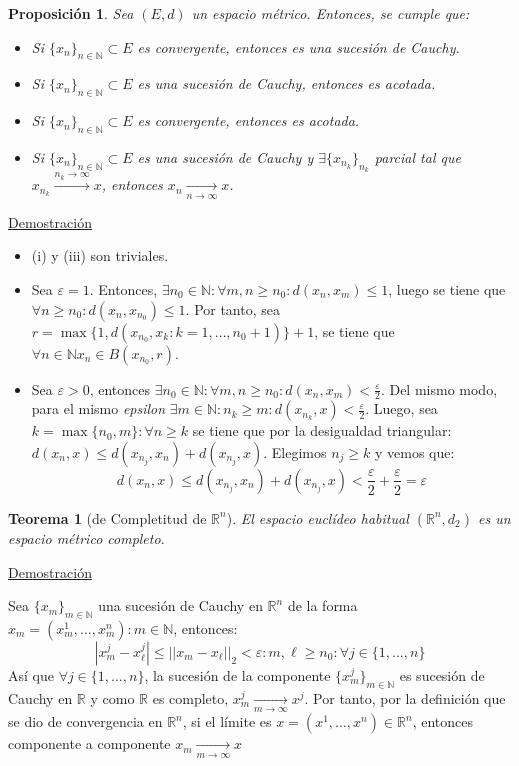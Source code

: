 \documentclass[10pt,a4paper,openright]{book}
\theoremstyle{break}
\newtheorem*{theo}{Teorema}
\newtheorem*{prop}{Proposición}
\begin{document}
\begin{prop}
Sea $(E,d)$ un espacio métrico. Entonces, se cumple que:
\begin{itemize}
\item Si $\{x_n\}_{n\in \mathbb{N}} \subset E$ es convergente, entonces es una sucesión de Cauchy.
\item Si $\{x_n\}_{n\in \mathbb{N}} \subset E$ es una sucesión de Cauchy, entonces es acotada.
\item Si $\{x_n\}_{n\in \mathbb{N}} \subset E$ es convergente, entonces  es acotada.
\item Si $\{x_n\}_{n\in \mathbb{N}} \subset E$ es una sucesión de Cauchy y $\exists \{ x_{n_k}\}_{n_k} $ parcial tal que $x_{n_k} \xrightarrow{n_k\rightarrow\infty} x$, entonces $x_n \xrightarrow[n\rightarrow\infty]{} x$.
\end{itemize}
\end{prop}

\underline{Demostración}

\begin{itemize}
\item (i) y (iii) son triviales.
\item Sea $\varepsilon = 1$. Entonces, $\exists n_0\in \mathbb{N} : \forall m,n \geq n_0 : d(x_n, x_m) \leq 1$, luego se tiene que $\forall n \geq n_0: d(x_n, x_{n_0}) \leq 1$. Por tanto, sea $r = \max \{1, d(x_{n_0}, x_k : k=1, \ldots, n_0 + 1)\} + 1$, se tiene que $\forall n \in \mathbb{N}x_n \in B(x_{n_0}, r)$.

\item Sea $\varepsilon > 0$, entonces $\exists n_0 \in \mathbb{N} :\forall  m, n \geq n_0: d(x_n,x_m) < \frac{\varepsilon}{2}$. Del mismo modo, para el mismo \textit{epsilon} $\exists m \in \mathbb{N} : n_k \geq m: d(x_{n_k}, x) < \frac{\varepsilon}{2}$. Luego, sea $k = \max\{n_0, m\} : \forall n \geq k$ se tiene que por la desigualdad triangular:
$d(x_n, x) \leq d(x_{n_j}, x_n) + d(x_{n_j},x)$. Elegimos $n_j \geq k$ y vemos que:
$$d(x_n, x) \leq d(x_{n_j}, x_n) + d(x_{n_j},x) < \frac{\varepsilon}{2} + \frac{\varepsilon}{2} = \varepsilon$$
\end{itemize}

\begin{theo}[de Completitud de $\mathbb{R}^n$]
El espacio euclídeo habitual $(\mathbb{R}^n, d_2)$ es un espacio métrico completo.
\end{theo}

\underline{Demostración}

Sea $\{x_m\}_{m\in \mathbb{N}}$ una sucesión de Cauchy en $\mathbb{R}^n$ de la forma $x_m = (x_m^1, \ldots , x_m^n) : m \in \mathbb{N}$, entonces:
$$|x_m^j - x_\ell^j| \leq ||x_m - x_\ell ||_2 < \varepsilon : m,\ell \geq n_0 : \forall j \in \{ 1, \ldots,n\}$$
Así que $\forall j \in \{ 1, \ldots,n\}$, la sucesión de la componente $\{x_m^j\}_{m \in \mathbb{N}}$ es sucesión de Cauchy en $\mathbb{R}$ y como $\mathbb{R}$ es completo, $x_m^j \xrightarrow[m\rightarrow\infty]{} x^j$. Por tanto, por la definición que se dio de convergencia en $\mathbb{R}^{n}$, si el límite es $x=(x^1, \ldots, x^n) \in \mathbb{R}^n$, entonces componente a componente $x_m \xrightarrow[m\rightarrow\infty]{} x$
\end{document}
